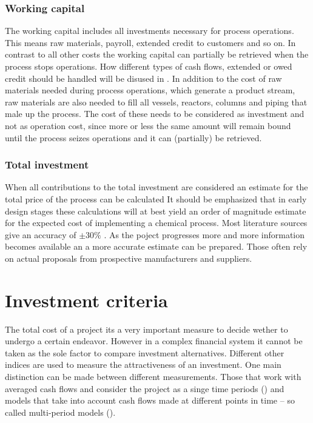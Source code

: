\subsubsection{Working capital}
The working capital includes all investments necessary for process operations. This means raw
materials, payroll, extended credit to customers and so on. In contrast to all other costs the
working capital can partially be retrieved when the process stops operations. How different
types of cash flows, extended or owed credit should be handled will be disused in
. In addition to the cost of raw materials needed during process
operations, which generate a product stream, raw materials are also needed to fill all vessels, reactors,
columns and piping that male up the process. The cost of these needs to be considered as investment
and not as operation cost, since more or less the same amount will remain bound until
the process seizes operations and it can (partially) be retrieved.



\subsubsection{Total investment}
    When all contributions to the total investment are considered an estimate for the total price of the
    process can be calculated
    It should be emphasized that in early design stages these calculations will at best yield an order of
    magnitude estimate for the expected cost of implementing a chemical process. Most literature sources
    give an accuracy of $\pm 30 \%$  \cite{Peters.2003}. As the poject progresses more and more information
    becomes available an a more accurate estimate can be prepared. Those often rely on actual proposals
    from prospective manufacturers and suppliers.


\section{Investment criteria}
\label{sec:InvestmentCriteria}
    The total cost of a project its a very important measure to decide wether to undergo a certain endeavor.
    However in a complex financial system it cannot be taken as the sole factor to compare investment
    alternatives. Different other indices are used to measure the attractiveness of an investment. One
    main distinction can be made between different measurements. Those that work with averaged cash flows
    and consider the project as a singe time periods () and models that take into
    account cash flows made at different points in time -- so called multi-period models
    ().


